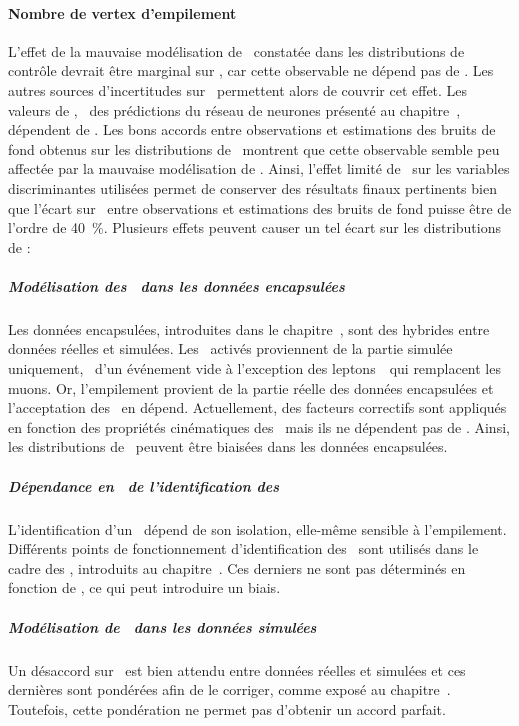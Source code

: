 {\paragraph{Nombre de vertex d'empilement}
L'effet de la mauvaise modélisation de \Npu\ constatée dans les distributions de contrôle
devrait être marginal sur \mTtot,
car cette observable ne dépend pas de \Npu.
Les autres sources d'incertitudes sur \mTtot\ permettent alors de couvrir cet effet.
Les valeurs de \mml, \ie\ des prédictions du réseau de neurones présenté au chapitre~,
dépendent de \Npu.
Les bons accords
entre observations et estimations des bruits de fond
obtenus sur les distributions de \mml\
montrent que cette observable semble peu affectée par la mauvaise modélisation de \Npu.
Ainsi,
l'effet limité de \Npu\ sur les variables discriminantes utilisées
permet de conserver des résultats finaux pertinents
bien que l'écart sur \Npu\
entre observations et estimations des bruits de fond
puisse être de l'ordre de \SI{40}{\%}.
Plusieurs effets peuvent causer un tel écart sur les distributions de \Npu:
\subparagraph{Modélisation des \HLTpaths\ dans les données encapsulées}
Les données encapsulées,
introduites dans le chapitre~\refChHTT,
sont des hybrides entre données réelles et simulées.
Les \HLTpaths\ activés proviennent de la partie simulée uniquement,
\ie\ d'un événement vide à l'exception des leptons~\tau\ qui remplacent les muons.
Or, l'empilement provient de la partie réelle des données encapsulées
et l'acceptation des \HLTpaths\ en dépend.
Actuellement,
des facteurs correctifs sont appliqués en fonction des propriétés cinématiques des \tau\
mais ils ne dépendent pas de \Npu.
Ainsi, les distributions de \Npu\ peuvent être biaisées dans les données encapsulées.
\subparagraph{Dépendance en \Npu\ de l'identification des \tauh}
L'identification d'un \tauh\ dépend de son isolation,
elle-même sensible à l'empilement.
Différents points de fonctionnement
d'identification des \tauh\ sont utilisés dans le cadre des \fakefactors,
introduits au chapitre~\refChHTT.
Ces derniers ne sont pas déterminés en fonction de \Npu,
ce qui peut introduire un biais.
\subparagraph{Modélisation de \Npu\ dans les données simulées}
Un désaccord sur \Npu\ est bien attendu entre données réelles et simulées
et ces dernières sont pondérées afin de le corriger, comme exposé au chapitre~.
Toutefois, cette pondération ne permet pas d'obtenir un accord parfait.

\def\EMBFFchoice{emb_ff}

}{
}